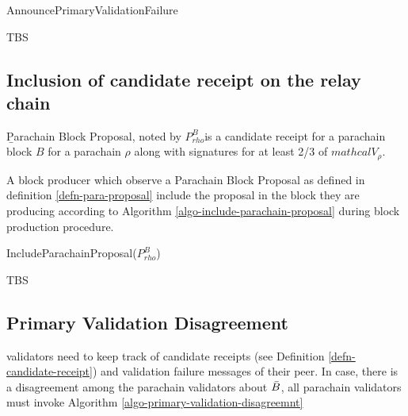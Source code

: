 \begin{algorithm}
  \caption[]{\sc AnnouncePrimaryValidationFailure}
  \label{algo-announce-primary-validation-failure}
  \begin{algorithmic}[1]
    \Require{}
    
    \State TBS
  \end{algorithmic}
\end{algorithm}

\subsection{Inclusion of candidate receipt on the relay chain}\label{sect-inclusion-of-candidate-receipt}

\begin{definition}
  \label{defn-para-proposal}
        {\b Parachain Block Proposal}, noted by $P^B_{rho}$is a candidate receipt for a parachain block $B$ for a parachain $\rho$ along with signatures for at least 2/3 of $mathcal{V}_\rho$.  %
\end{definition}

A block producer which observe a Parachain Block Proposal as defined in definition \ref{defn-para-proposal}  include the proposal in the block they are producing according to Algorithm \ref{algo-include-parachain-proposal} during block production procedure.

\begin{algorithm}
  \caption[]{\sc IncludeParachainProposal($P^B_{rho}$)}
  \label{algo-include-parachain-proposal}
  \begin{algorithmic}[1]
    \Require{}
    
    \State TBS
  \end{algorithmic}
\end{algorithm}


\subsection{Primary Validation Disagreement}
\label{sect-primary-validation-disagreemnt}
 validators need to keep track of candidate receipts (see Definition \ref{defn-candidate-receipt}) and validation failure messages of their peer. In case, there is a disagreement among the parachain validators about $\bar{B}$, all parachain validators must invoke Algorithm \ref{algo-primary-validation-disagreemnt}


